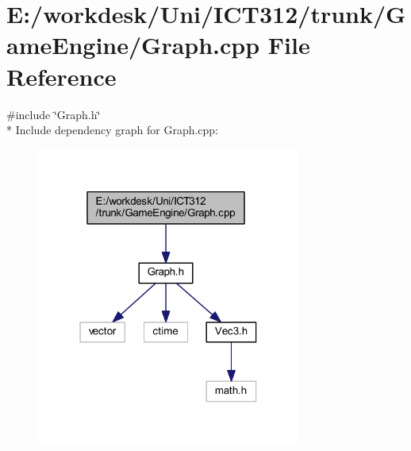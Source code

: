\section{E\+:/workdesk/\+Uni/\+I\+C\+T312/trunk/\+Game\+Engine/\+Graph.cpp File Reference}
\label{_graph_8cpp}
{\ttfamily \#include \char`\"{}Graph.\+h\char`\"{}}\\*
Include dependency graph for Graph.\+cpp\+:
\nopagebreak
\begin{figure}[H]
\begin{center}
\leavevmode
\includegraphics[width=247pt]{d3/d43/_graph_8cpp__incl}
\end{center}
\end{figure}
